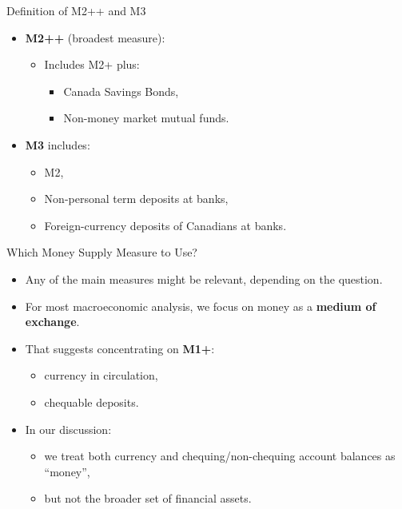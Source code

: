\documentclass[aspectratio=169]{beamer}
\begin{document}
\begin{frame}{Definition of M2++ and M3}
\transfade
\begin{itemize}[<+->]
  \item \textbf{M2++} (broadest measure):
  \begin{itemize}[<+->]
    \item Includes M2+ plus:
    \begin{itemize}[<+->]
      \item Canada Savings Bonds,
      \item Non-money market mutual funds.
    \end{itemize}
  \end{itemize}
  \item \textbf{M3} includes:
  \begin{itemize}[<+->]
    \item M2,
    \item Non-personal term deposits at banks,
    \item Foreign-currency deposits of Canadians at banks.
  \end{itemize}
\end{itemize}
\end{frame}

\begin{frame}{Which Money Supply Measure to Use?}
\transfade
\begin{itemize}[<+->]
  \item Any of the main measures might be relevant, depending on the question.
  \item For most macroeconomic analysis, we focus on money as a \textbf{medium of exchange}.
  \item That suggests concentrating on \textbf{M1+}:
  \begin{itemize}[<+->]
    \item currency in circulation,
    \item chequable deposits.
  \end{itemize}
  \item In our discussion:
  \begin{itemize}[<+->]
    \item we treat both currency and chequing/non-chequing account balances as “money”,
    \item but not the broader set of financial assets.
  \end{itemize}
\end{itemize}
\end{frame}
\end{document}
